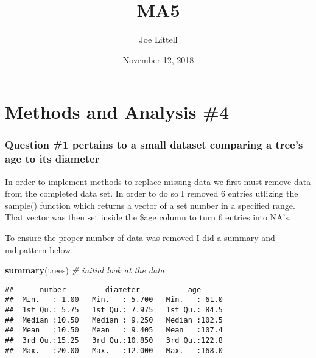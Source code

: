 \documentclass[]{article}
\title{MA5}
\author{Joe Littell}
\date{November 12, 2018}
\newenvironment{Shaded}{\begin{snugshade}}{\end{snugshade}}
\newcommand{\KeywordTok}[1]{\textcolor[rgb]{0.13,0.29,0.53}{\textbf{#1}}}
\newcommand{\DecValTok}[1]{\textcolor[rgb]{0.00,0.00,0.81}{#1}}
\newcommand{\StringTok}[1]{\textcolor[rgb]{0.31,0.60,0.02}{#1}}
\newcommand{\CommentTok}[1]{\textcolor[rgb]{0.56,0.35,0.01}{\textit{#1}}}
\newcommand{\OtherTok}[1]{\textcolor[rgb]{0.56,0.35,0.01}{#1}}
\newcommand{\OperatorTok}[1]{\textcolor[rgb]{0.81,0.36,0.00}{\textbf{#1}}}
\newcommand{\NormalTok}[1]{#1}
\begin{document}
\maketitle

\section{Methods and Analysis \#4}\label{methods-and-analysis-4}

\subsubsection{Question \#1 pertains to a small dataset comparing a
tree's age to its
diameter}\label{question-1-pertains-to-a-small-dataset-comparing-a-trees-age-to-its-diameter}

In order to implement methods to replace missing data we first must
remove data from the completed data set. In order to do so I removed 6
entries utlizing the sample() function which returns a vector of a set
number in a specified range. That vector was then set inside the \$age
column to turn 6 entries into NA's.

To ensure the proper number of data was removed I did a summary and
md.pattern below.

\begin{Shaded}
\begin{Highlighting}[]
\KeywordTok{summary}\NormalTok{(trees)                           }\CommentTok{# initial look at the data}
\end{Highlighting}
\end{Shaded}

\begin{verbatim}
##      number         diameter           age       
##  Min.   : 1.00   Min.   : 5.700   Min.   : 61.0  
##  1st Qu.: 5.75   1st Qu.: 7.975   1st Qu.: 84.5  
##  Median :10.50   Median : 9.250   Median :102.5  
##  Mean   :10.50   Mean   : 9.405   Mean   :107.4  
##  3rd Qu.:15.25   3rd Qu.:10.850   3rd Qu.:122.8  
##  Max.   :20.00   Max.   :12.000   Max.   :168.0
\end{verbatim}

\begin{Shaded}
\end{Shaded}
\end{document}
